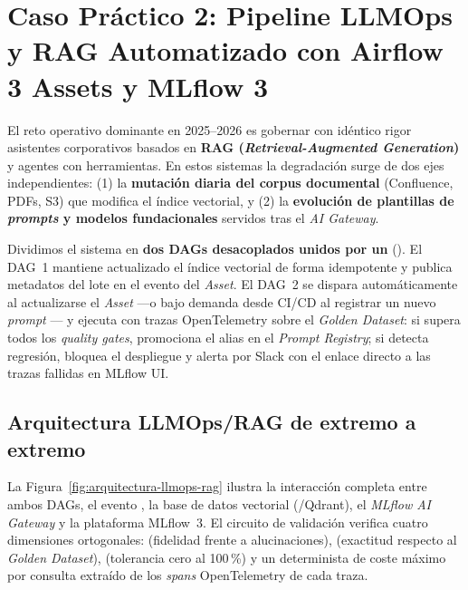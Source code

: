 \section[Caso Práctico 2: LLMOps y RAG con Assets]{Caso Práctico 2: Pipeline LLMOps y RAG Automatizado con Airflow 3 Assets y MLflow 3}\label{sec:caso-llmops-rag}

El reto operativo dominante en 2025--2026 es gobernar con idéntico rigor asistentes corporativos basados en \textbf{RAG (\textit{Retrieval-Augmented Generation})} y agentes con herramientas. En estos sistemas la degradación surge de dos ejes independientes: (1) la \textbf{mutación diaria del corpus documental} (Confluence, PDFs, S3) que modifica el índice vectorial, y (2) la \textbf{evolución de plantillas de \textit{prompts} y modelos fundacionales} servidos tras el \textit{AI Gateway}.

\begin{modernbox}
  Dividimos el sistema en \textbf{dos DAGs desacoplados unidos por un } (). El DAG~1 mantiene actualizado el índice vectorial de forma idempotente y publica metadatos del lote en el evento del \textit{Asset}. El DAG~2 se dispara automáticamente al actualizarse el \textit{Asset} ---o bajo demanda desde CI/CD al registrar un nuevo \textit{prompt} --- y ejecuta  con trazas OpenTelemetry sobre el \textit{Golden Dataset}: si supera todos los \textit{quality gates}, promociona el alias  en el \textit{Prompt Registry}; si detecta regresión, bloquea el despliegue y alerta por Slack con el enlace directo a las trazas fallidas en MLflow UI.
\end{modernbox}

\subsection{Arquitectura LLMOps/RAG de extremo a extremo}

La Figura~\ref{fig:arquitectura-llmops-rag} ilustra la interacción completa entre ambos DAGs, el evento , la base de datos vectorial (/Qdrant), el \textit{MLflow AI Gateway} y la plataforma MLflow~3. El circuito de validación verifica cuatro dimensiones ortogonales:  (fidelidad frente a alucinaciones),  (exactitud respecto al \textit{Golden Dataset}),  (tolerancia cero al 100\,\%) y un  determinista de coste máximo por consulta extraído de los \textit{spans} OpenTelemetry de cada traza.


